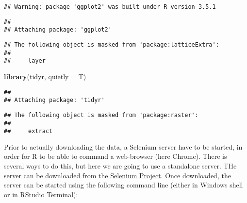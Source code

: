 \documentclass[]{article}
\newenvironment{Shaded}{\begin{snugshade}}{\end{snugshade}}
\newcommand{\KeywordTok}[1]{\textcolor[rgb]{0.13,0.29,0.53}{\textbf{#1}}}
\newcommand{\DataTypeTok}[1]{\textcolor[rgb]{0.13,0.29,0.53}{#1}}
\newcommand{\StringTok}[1]{\textcolor[rgb]{0.31,0.60,0.02}{#1}}
\newcommand{\CommentTok}[1]{\textcolor[rgb]{0.56,0.35,0.01}{\textit{#1}}}
\newcommand{\NormalTok}[1]{#1}
\begin{document}
\begin{verbatim}
## Warning: package 'ggplot2' was built under R version 3.5.1
\end{verbatim}

\begin{verbatim}
## 
## Attaching package: 'ggplot2'
\end{verbatim}

\begin{verbatim}
## The following object is masked from 'package:latticeExtra':
## 
##     layer
\end{verbatim}

\begin{Shaded}
\begin{Highlighting}[]
\KeywordTok{library}\NormalTok{(tidyr, }\DataTypeTok{quietly =}\NormalTok{ T)}
\end{Highlighting}
\end{Shaded}

\begin{verbatim}
## 
## Attaching package: 'tidyr'
\end{verbatim}

\begin{verbatim}
## The following object is masked from 'package:raster':
## 
##     extract
\end{verbatim}

\begin{Shaded}
\end{Shaded}

Prior to actually downloading the data, a Selenium server have to be
started, in order for R to be able to command a web-browser (here
Chrome). There is several ways to do this, but here we are going to use
a standalone server. THe server can be downloaded from the
\href{http://selenium-release.storage.googleapis.com/index.html}{Selenium
Project}. Once downloaded, the server can be started using the following
command line (either in Windows shell or in RStudio Terminal):
\end{document}
